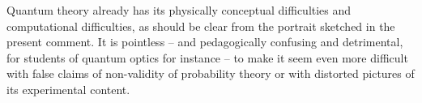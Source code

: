 \documentclass[\ifafour a4paper,12pt,\else a5paper,10pt,\fi%
onecolumn,oneside,article,%
british%
]{memoir}
\makeatletter
\theoremstyle{remark}
\theoremstyle{innote}
\def\sum{\DOTSI\sumop\slimits@}
\newcommand*{\mathte}[1]{\textbf{\textit{\textsf{#1}}}}
\newcommand*{\de}{\partialup}%
\newcommand*{\p}{\mathrm{P}}%
\renewcommand*{\|}[1][]{\nonscript\,#1\vert\nonscript\;\mathopen{}}
\newcommand*{\tsum}{\mathop{\textstyle\sum}\nolimits}
\newcommand*{\yM}{\mathte{M}}
\makeatother
\begin{document}
Quantum theory already has its physically conceptual difficulties and
computational difficulties, as should be clear from the portrait sketched
in the present comment. It is pointless -- and pedagogically confusing and
detrimental, for students of quantum optics for instance -- to make it seem
even more difficult with false claims of non-validity of probability theory
or with distorted pictures of its experimental content.







\end{document}

